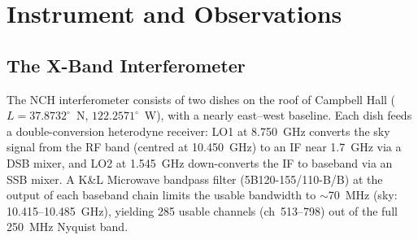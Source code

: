 \documentclass[10pt,preprint2]{aastex}
\begin{document}
\section{Instrument and Observations}
\label{sec:obs}

\subsection{The X-Band Interferometer}
\label{sec:instrument}

The NCH interferometer consists of two dishes on the roof of Campbell Hall ($L = 37.8732^\circ$~N, $122.2571^\circ$~W), with a nearly east--west baseline. Each dish feeds a double-conversion heterodyne receiver: LO1 at 8.750~GHz converts the sky signal from the RF band (centred at 10.450~GHz) to an IF near 1.7~GHz via a DSB mixer, and LO2 at 1.545~GHz down-converts the IF to baseband via an SSB mixer. A K\&L Microwave bandpass filter (5B120-155/110-B/B) at the output of each baseband chain limits the usable bandwidth to $\sim$70~MHz (sky: 10.415--10.485~GHz), yielding 285 usable channels (ch~513--798) out of the full 250~MHz Nyquist band.
\end{document}
